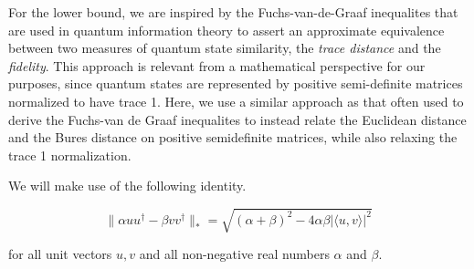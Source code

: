 For the lower bound, we are inspired by the Fuchs-van-de-Graaf inequalites that are used in quantum information theory to assert an approximate equivalence between two measures of quantum state similarity, the \emph{trace distance} and the \emph{fidelity}.
This approach is relevant from a mathematical perspective for our purposes, since quantum states are represented by positive semi-definite matrices normalized to have trace 1. 
Here, we use a similar approach as that often used to derive the Fuchs-van de Graaf inequalites to instead relate the Euclidean distance and the Bures distance on positive semidefinite matrices, while also relaxing the trace 1 normalization. 

We will make use of the following identity. 

\begin{lemma}

\begin{equation}
\| \alpha u u^{\dag} - \beta v v^{\dag} \|_* = \sqrt{(\alpha + \beta)^2 - 4 \alpha \beta \lvert \langle u,v \rangle\lvert^2 }
\end{equation}

for all unit vectors $u, v$ and all non-negative real numbers $\alpha$ and $\beta$. 
\end{lemma}

